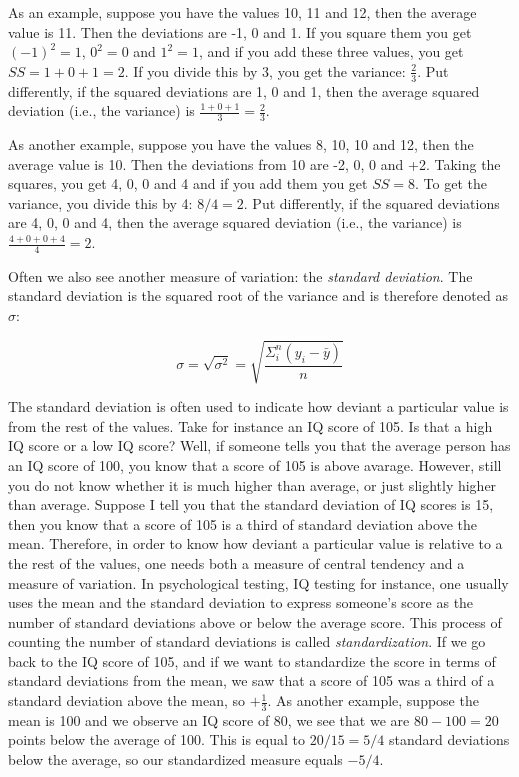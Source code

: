 \documentclass[]{report}\usepackage[]{graphicx}\usepackage[]{color}
\begin{document}
As an example, suppose you have the values 10, 11 and 12, then the average value is 11. Then the deviations are -1, 0 and 1. If you square them you get $(-1)^2=1$, $0^2=0$ and $1^2=1$, and if you add these three values, you get $SS=1+0+1=2$. If you divide this by 3, you get the variance: $\frac{2}{3}$. Put differently, if the squared deviations are 1, 0 and 1, then the average squared deviation (i.e., the variance) is $\frac{1+0+1}{3}=\frac{2}{3}$.

As another example, suppose you have the values 8, 10, 10 and 12, then the average value is 10. Then the deviations from 10 are -2, 0, 0 and +2. Taking the squares, you get 4, 0, 0 and 4 and if you add them you get $SS=8$. To get the variance, you divide this by 4: $8/4=2$. Put differently, if the squared deviations are 4, 0, 0 and 4, then the average squared deviation (i.e., the variance) is $\frac{4+0+0+4}{4}=2$.

Often we also see another measure of variation: the \textit{standard deviation}. The standard deviation is the squared root of the variance and is therefore denoted as $\sigma$:

\begin{equation}
\sigma = \sqrt{\sigma^2}=\sqrt{  \frac{\Sigma_i^n (y_i-\bar{y})}{n}}
\end{equation}

The standard deviation is often used to indicate how deviant a particular value is from the rest of the values. Take for instance an IQ score of 105. Is that a high IQ score or a low IQ score? Well, if someone tells you that the average person has an IQ score of 100, you know that a score of 105 is above avarage. However, still you do not know whether it is much higher than average, or just slightly higher than average. Suppose I tell you that the standard deviation of IQ scores is 15, then you know that a score of 105 is a third of standard deviation above the mean. Therefore, in order to know how deviant a particular value is relative to a the rest of the values, one needs both a measure of central tendency and a measure of variation. In psychological testing, IQ testing for instance, one usually uses the mean and the standard deviation to express someone's score as the number of standard deviations above or below the average score. This process of counting the number of standard deviations is called \textit{standardization}. If we go back to the IQ score of 105, and if we want to standardize the score in terms of standard deviations from the mean, we saw that a score of 105 was a third of a standard deviation above the mean, so $+\frac{1}{3}$. As another example, suppose the mean is 100 and we observe an IQ score of 80, we see that we are $80-100=20$ points below the average of 100. This is equal to $20/15=5/4$ standard deviations below the average, so our standardized measure equals $-5/4$.
\end{document}
